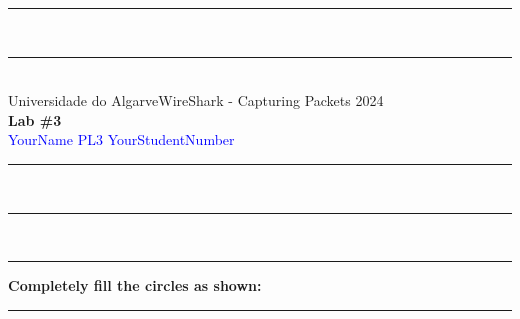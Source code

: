\documentclass{article}
\begin{document}
\begin{center}
\rule{\textwidth}{.0075in} \\
\rule[3mm]{\textwidth}{.0075in}\\

Universidade do Algarve\hfill WireShark - Capturing Packets \hfill 2024\\[3ex]

{\Large\bf Lab \#3} \\[3ex]

 \textcolor{blue}{YourName} \hfill  
 \textcolor{blue}{PL3} \hfill
 \textcolor{blue}{YourStudentNumber}\\

\rule{\textwidth}{.0075in} \\
\rule[3mm]{\textwidth}{.0075in} \\
\end{center}



\begin{center}
\rule{\textwidth}{0.4pt}
\textbf{Completely fill the circles as shown: \Circle \Circle \CIRCLE \Circle}
\rule{\textwidth}{0.4pt}
\end{center}
\end{document}

